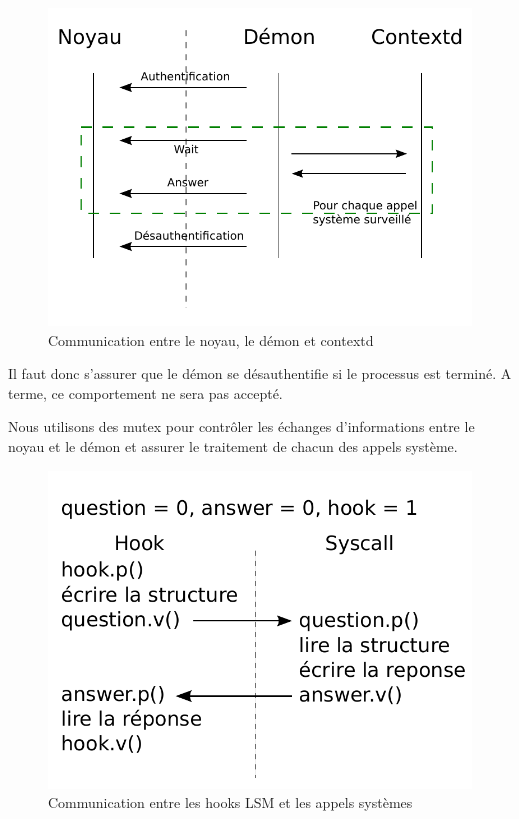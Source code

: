 \documentclass[pdftex,a4paper,titlepage,11pt,openright]{article}
\begin{document}
\begin{figure}[hb]
	\centering
	\includegraphics{global.pdf}
	\caption{Communication entre le noyau, le démon et contextd}
\end{figure}

Il faut donc s'assurer que le démon se désauthentifie si le processus est terminé. A terme, ce comportement ne sera pas accepté.

Nous utilisons des mutex pour contrôler les échanges d'informations entre le noyau et le démon et assurer le traitement de chacun des appels système.

\begin{figure}[hb]
	\centering
	\includegraphics{syscall_sync.pdf}
	\caption{Communication entre les hooks LSM et les appels systèmes}
\end{figure}
\end{document}
